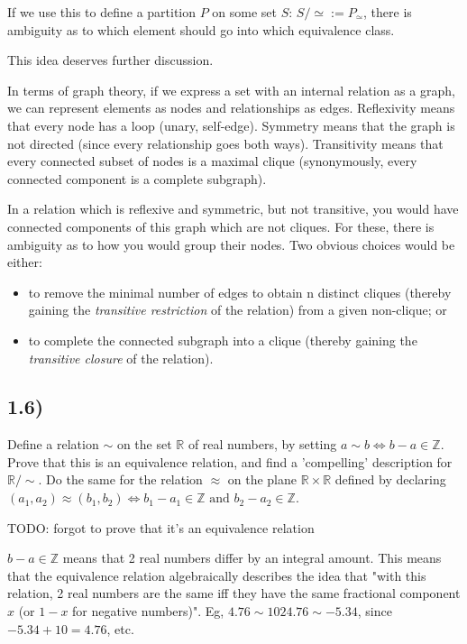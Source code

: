 \documentclass[12pt, letterpaper, twoside]{report}
\begin{document}
If we use this to define a partition $P$ on some set $S$: $S/\simeq := P_\simeq$, there is ambiguity as to which element should go into which equivalence class.

This idea deserves further discussion.

In terms of graph theory, if we express a set with an internal relation as a graph, we can represent elements as nodes and relationships as edges. Reflexivity means that every node has a loop (unary, self-edge). Symmetry means that the graph is not directed (since every relationship goes both ways). Transitivity means that every connected subset of nodes is a maximal clique (synonymously, every connected component is a complete subgraph).

In a relation which is reflexive and symmetric, but not transitive, you would have connected components of this graph which are not cliques. For these, there is ambiguity as to how you would group their nodes. Two obvious choices would be either:

\begin{itemize}
	\item to remove the minimal number of edges to obtain n distinct cliques (thereby gaining the \textit{transitive restriction} of the relation) from a given non-clique; or

	\item to complete the connected subgraph into a clique (thereby gaining the \textit{transitive closure} of the relation).
\end{itemize}



\subsection*{1.6)}

Define a relation $\sim$ on the set $\mathbb{R}$ of real numbers, by setting $a \sim b \Leftrightarrow b - a \in \mathbb{Z}$. Prove that this is an equivalence relation, and find a 'compelling' description for $\mathbb{R}/\sim$. Do the same for the relation $\approx$ on the plane $\mathbb{R} \times \mathbb{R}$ defined by declaring $(a_1, a_2) \approx (b_1, b_2) \Leftrightarrow b_1 - a_1 \in \mathbb{Z} \text{ and } b_2 - a_2 \in \mathbb{Z}$.

TODO: forgot to prove that it's an equivalence relation

$b - a \in \mathbb{Z}$ means that 2 real numbers differ by an integral amount. This means that the equivalence relation algebraically describes the idea that "with this relation, 2 real numbers are the same iff they have the same fractional component $x$ (or $1 - x$ for negative numbers)". Eg, $4.76 \sim 1024.76 \sim -5.34$, since $-5.34 + 10 = 4.76$, etc.
\end{document}
